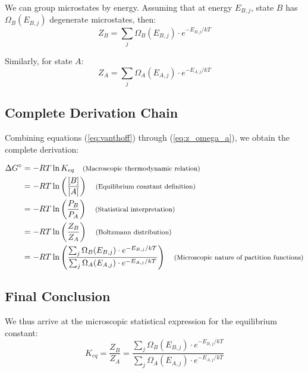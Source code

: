 \documentclass[12pt]{article}
\begin{document}
We can group microstates by energy. Assuming that at energy $E_{B,j}$, state $B$ has $\Omega_B(E_{B,j})$ degenerate microstates, then:
\begin{equation}
    Z_B = \sum_j \Omega_B(E_{B,j}) \cdot e^{-E_{B,j} / kT}
    \label{eq:z_omega}
\end{equation}

Similarly, for state $A$:
\begin{equation}
    Z_A = \sum_j \Omega_A(E_{A,j}) \cdot e^{-E_{A,j} / kT}
    \label{eq:z_omega_a}
\end{equation}

\subsection*{Complete Derivation Chain}
Combining equations (\ref{eq:vanthoff}) through (\ref{eq:z_omega_a}), we obtain the complete derivation:

\begin{align*}
    \Delta G^\circ &= -RT \ln K_{eq} 
    \quad \text{\footnotesize (Macroscopic thermodynamic relation)} \\
    &= -RT \ln \left( \frac{[B]}{[A]} \right)
    \quad \text{\footnotesize (Equilibrium constant definition)} \\
    &= -RT \ln \left( \frac{P_B}{P_A} \right)
    \quad \text{\footnotesize (Statistical interpretation)} \\
    &= -RT \ln \left( \frac{Z_B}{Z_A} \right)
    \quad \text{\footnotesize (Boltzmann distribution)} \\
    &= -RT \ln \left( 
        \frac{\sum_j \Omega_B(E_{B,j}) \cdot e^{-E_{B,j} / kT}}
             {\sum_j \Omega_A(E_{A,j}) \cdot e^{-E_{A,j} / kT}}
    \right)
    \quad \text{\footnotesize (Microscopic nature of partition functions)}
\end{align*}

\subsection*{Final Conclusion}
We thus arrive at the microscopic statistical expression for the equilibrium constant:
\begin{equation}
    \boxed{
        K_{eq} = \frac{Z_B}{Z_A} = 
        \frac{\sum_j \Omega_B(E_{B,j}) \cdot e^{-E_{B,j} / kT}}
             {\sum_j \Omega_A(E_{A,j}) \cdot e^{-E_{A,j} / kT}}
    }
    \label{eq:final_result}
\end{equation}
\end{document}
